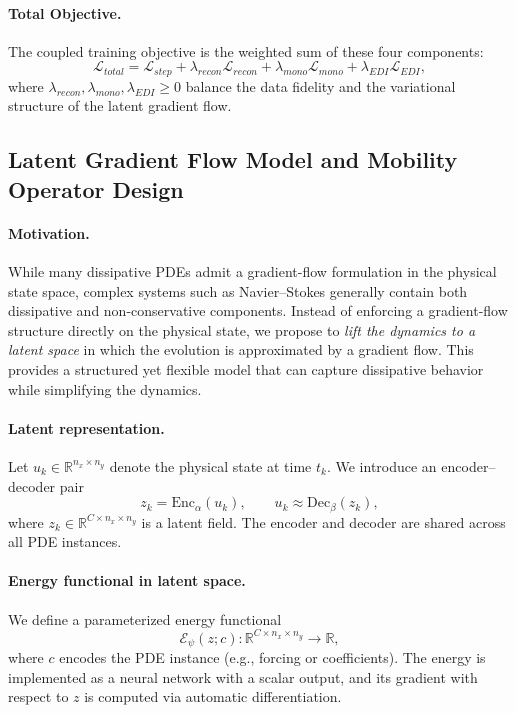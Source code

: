 \documentclass[11pt]{article}
\begin{document}
\paragraph{Total Objective.}
The coupled training objective is the weighted sum of these four components:
$$ \mathcal{L}_{total} = \mathcal{L}_{step} + \lambda_{recon} \mathcal{L}_{recon} + \lambda_{mono} \mathcal{L}_{mono} + \lambda_{EDI} \mathcal{L}_{EDI}, $$
where $\lambda_{recon}, \lambda_{mono}, \lambda_{EDI} \ge 0$ balance the data fidelity and the variational structure of the latent gradient flow.

\iffalse
\subsection{Latent Gradient Flow Model and Mobility Operator Design}
\paragraph{Motivation.}
While many dissipative PDEs admit a gradient-flow formulation in the physical state space, complex systems such as Navier--Stokes generally contain both dissipative and non-conservative components.
Instead of enforcing a gradient-flow structure directly on the physical state, we propose to \emph{lift the dynamics to a latent space} in which the evolution is approximated by a gradient flow.
This provides a structured yet flexible model that can capture dissipative behavior while simplifying the dynamics.

\paragraph{Latent representation.}
Let $u_k \in \mathbb{R}^{n_x \times n_y}$ denote the physical state at time $t_k$.
We introduce an encoder--decoder pair
\[
z_k = \mathrm{Enc}_\alpha(u_k),
\qquad
u_k \approx \mathrm{Dec}_\beta(z_k),
\]
where $z_k \in \mathbb{R}^{C \times n_x \times n_y}$ is a latent field.
The encoder and decoder are shared across all PDE instances.

\paragraph{Energy functional in latent space.}
We define a parameterized energy functional
\[
\mathcal E_\psi(z;c): \mathbb{R}^{C \times n_x \times n_y} \to \mathbb{R},
\]
where $c$ encodes the PDE instance (e.g., forcing or coefficients).
The energy is implemented as a neural network with a scalar output, and its gradient with respect to $z$ is computed via automatic differentiation.
\end{document}
